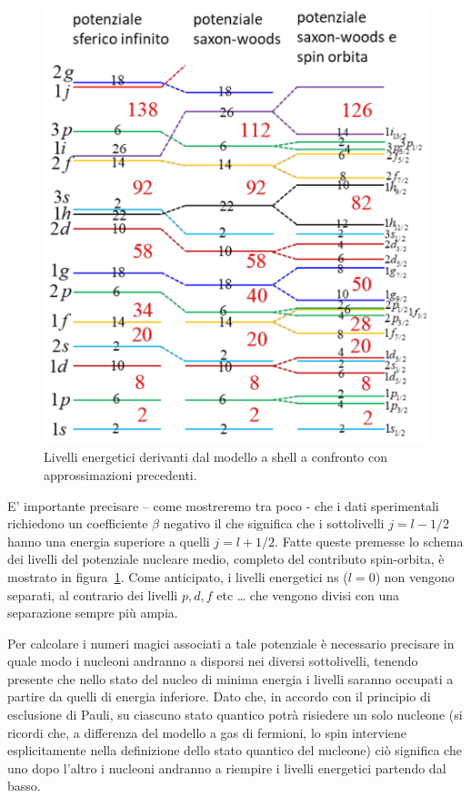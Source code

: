 \begin{figure}
	\centering
	\includegraphics{figs/shell-model-energy-level-final}
	\caption{Livelli energetici derivanti dal modello a shell a confronto con approssimazioni precedenti.}
	\label{fig:shell-model-energy-level-final}
\end{figure}
E’ importante precisare – come mostreremo tra poco - che i dati sperimentali richiedono un coefficiente $\beta$ negativo il che significa che i sottolivelli $j=l-1/2$ hanno una energia superiore a quelli $j=l+1/2$.
Fatte queste premesse lo schema dei livelli del potenziale nucleare medio, completo del contributo spin-orbita, è mostrato in figura~\ref{fig:shell-model-energy-level-final}.
Come anticipato, i livelli energetici ns ($l=0$) non vengono separati, al contrario dei livelli $p, d, f$ etc \ldots
che vengono divisi con una separazione sempre più ampia.

Per calcolare i numeri magici associati a tale potenziale è necessario precisare in quale modo i nucleoni andranno a disporsi nei diversi sottolivelli, tenendo presente che nello stato del nucleo di minima energia i livelli saranno occupati a partire da quelli di energia inferiore. Dato che, in accordo con il principio di esclusione di Pauli, su ciascuno stato quantico potrà risiedere un solo nucleone (si ricordi che, a differenza del modello a gas di fermioni, lo spin interviene esplicitamente nella definizione dello stato quantico del nucleone) ciò significa che uno dopo l’altro i nucleoni andranno a riempire i livelli energetici partendo dal basso.

